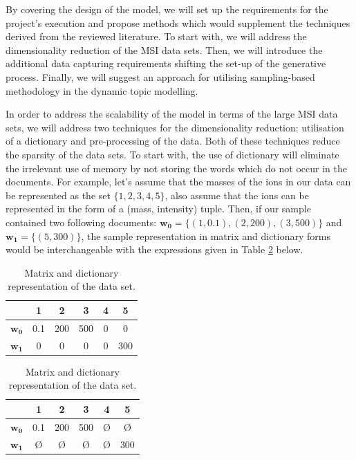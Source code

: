 \documentclass{mprop}
\begin{document}
\par By covering the design of the model, we will set up the requirements for the project's execution and propose methods which would supplement the techniques derived from the reviewed literature. To start with, we will address the dimensionality reduction of the MSI data sets. Then, we will introduce the additional data capturing requirements shifting the set-up of the generative process. Finally, we will suggest an approach for utilising sampling-based methodology in the dynamic topic modelling. 

\par In order to address the scalability of the model in terms of the large MSI data sets, we will address two techniques for the dimensionality reduction: utilisation of a dictionary and pre-processing of the data. Both of these techniques reduce the sparsity of the data sets. To start with, the use of dictionary will eliminate the irrelevant use of memory by not storing the words which do not occur in the documents. For example, let's assume that the masses of the ions in our data can be represented as the set $\{1, 2, 3, 4, 5\}$, also assume that the ions can be represented in the form of a (mass, intensity) tuple. Then, if our sample contained two following documents: $\mathbf{w_0} = \{(1, 0.1), (2, 200), (3, 500)\}$ and $\mathbf{w_1} = \{(5, 300)\}$, the sample representation in matrix and dictionary forms would be interchangeable with the expressions given in Table \ref{tab:m_and_d} below.
\begin{table}[H]
\begin{center}
\begin{tabular}{|c||c|c|c|c|c|}
\hline
&1&2&3&4&5\\
\hline
$\mathbf{w_0}$&0.1&200&500&0&0\\
$\mathbf{w_1}$&0&0&0&0&300\\
\hline
\end{tabular}
\quad
\begin{tabular}{|c||c|c|c|c|c|}
\hline
&1&2&3&4&5\\
\hline
$\mathbf{w_0}$&0.1&200&500&\O&\O\\
$\mathbf{w_1}$&\O&\O&\O&\O&300\\
\hline
\end{tabular}
\end{center}
\caption{Matrix and dictionary representation of the data set.}
\label{tab:m_and_d}
\end{table}
\end{document}
